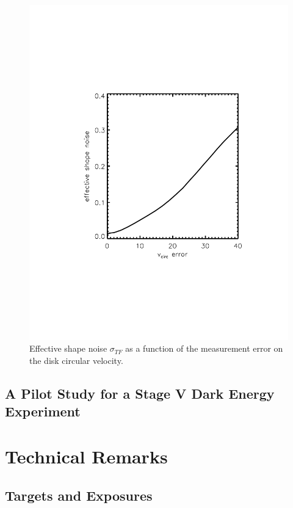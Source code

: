 \documentclass[11pt,preprint]{aastex}
\begin{document}
\begin{figure}[t]
\includegraphics[width=\linewidth, bb= 150 150 550 650,clip]{Plots/vcirc_error.pdf}
\caption{Effective shape noise $\sigma_{TF}$ as a  function of the
  measurement error on the disk circular velocity.}
\label{fig:shapeNoise}
\end{figure}

\subsection{A Pilot Study for a Stage V Dark Energy Experiment}




\section{Technical Remarks}

\subsection{Targets and Exposures}
\end{document}
